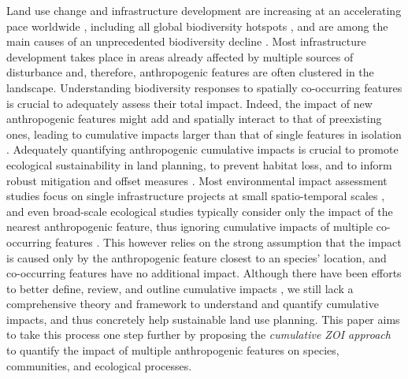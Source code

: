 \documentclass[titlepage]{article}
\begin{document}
Land use change and infrastructure development are increasing at an accelerating pace worldwide \citep{ibisch_global_2016,venter_sixteen_2016}, including all global biodiversity hotspots \citep{hu_overview_2021}, and are among the main causes of an unprecedented biodiversity decline \citep[][IPBES, 2019]{benitez-lopez_impacts_2010,newbold_global_2015}. Most infrastructure development takes place in areas already affected by multiple sources of disturbance \citep{barber_roads_2014} and, therefore, anthropogenic features are often clustered in the landscape. Understanding biodiversity responses to spatially co-occurring features is crucial to adequately assess their total impact. Indeed, the impact of new anthropogenic features might add and spatially interact to that of preexisting ones, leading to cumulative impacts larger than that of single features in isolation \citep[Box 1; ][]{naugle_unifying_2011}.  
Adequately quantifying anthropogenic cumulative impacts is crucial to promote ecological sustainability in land planning, to prevent habitat loss, and to inform robust mitigation and offset measures \citep{gillingham_integration_2016, laurance_roads_2017}. Most environmental impact assessment studies focus on single infrastructure projects at small spatio-temporal scales \citep{johnson_regulating_2011}, and even broad-scale ecological studies typically consider only the impact of the nearest anthropogenic feature, thus ignoring cumulative impacts of multiple co-occurring features \citep[e.g.][]{torres_assessing_2016}. This however relies on the strong assumption that the impact is caused only by the anthropogenic feature closest to an species’ location, and co-occurring features have no additional impact. Although there have been efforts to better define, review, and outline cumulative impacts \citep{gillingham_integration_2016,naugle_unifying_2011}, we still lack a comprehensive theory and framework to understand and quantify cumulative impacts, and thus concretely help sustainable land use planning. This paper aims to take this process one step further by proposing the \textit{cumulative ZOI approach} to quantify the impact of multiple anthropogenic features on species, communities, and ecological processes.
\end{document}
